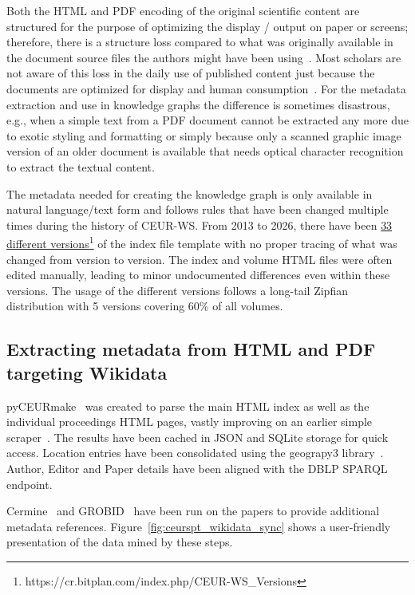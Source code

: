 \documentclass[runningheads]{llncs}
\newcommand{\footnotelink}[2]{\href{#1}{#2}\footnote{#1}}
\begin{document}
Both the HTML and PDF encoding of the original scientific content are structured for the purpose of optimizing the display / output on paper or screens; therefore, there is a structure loss compared to what was originally available in the document source files the authors might have been using~\cite{Fahl2023HSP}. Most scholars are not aware of this loss in the daily use of published content just because the documents are optimized for display and human consumption~\cite{Yu2020,Ansorge_2021}. For the metadata extraction and use in knowledge graphs the difference is sometimes disastrous, e.g., when a simple text from a PDF document cannot be extracted any more due to exotic styling and formatting or simply because only a scanned graphic image version of an older document is available that needs optical character recognition to extract the textual content.

The metadata needed for creating the knowledge graph is only available in natural language/text form and follows rules that have been changed multiple times during the history of CEUR-WS. From 2013 to 2026, there have been \footnotelink{https://cr.bitplan.com/index.php/CEUR-WS\_Versions}{33 different versions} of the index file template with no proper tracing of what was changed from version to version. The index and volume HTML files were often edited manually, leading to minor undocumented differences even within these versions. The usage of the different versions follows a long-tail Zipfian distribution with 5 versions covering 60\% of all volumes.

\subsection{Extracting metadata from HTML and PDF targeting Wikidata}
\label{sec:Extracting metadata from HTML and PDF targeting Wikidata}
pyCEURmake~\cite{pyCEURmake} was created to parse the main HTML index as well as the individual proceedings HTML pages, vastly improving on an earlier simple scraper~\cite{Nielsen2021}.
The results have been cached in JSON and SQLite storage for quick access. Location entries have been consolidated using the geograpy3 library~\cite{geograpy3}. Author, Editor and Paper details have been aligned with the DBLP SPARQL endpoint.

Cermine~\cite{Tkaczyk_2015} and GROBID~\cite{Lopez_2009} have been run on the papers to provide additional metadata references. Figure~\ref{fig:ceurspt_wikidata_sync} shows a user-friendly presentation of the data mined by these steps.
\end{document}
